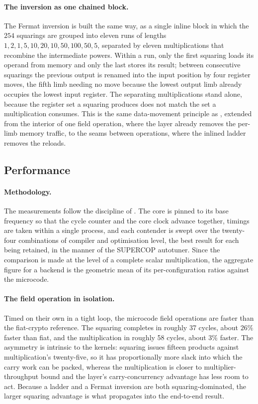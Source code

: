\paragraph{The inversion as one chained block.}
The Fermat inversion is built the same way, as a single inline block in which the
$254$ squarings are grouped into eleven runs of lengths
$1,2,1,5,10,20,10,50,100,50,5$, separated by eleven multiplications that recombine
the intermediate powers. Within a run, only the first squaring loads its operand
from memory and only the last stores its result; between consecutive squarings the
previous output is renamed into the input position by four register moves, the
fifth limb needing no move because the lowest output limb already occupies the
lowest input register. The separating multiplications stand alone, because the
register set a squaring produces does not match the set a multiplication consumes.
This is the same data-movement principle as , extended from the
interior of one field operation, where the layer already removes the per-limb
memory traffic, to the seams between operations, where the inlined ladder removes
the reloads.

\subsection{Performance}
\label{sec:c25519-perf}

\paragraph{Methodology.}
The measurements follow the discipline of . The core is pinned to
its base frequency so that the cycle counter and the core clock advance together,
timings are taken within a single process, and each contender is swept over the
twenty-four combinations of compiler and optimisation level, the best result for
each being retained, in the manner of the SUPERCOP autotuner. Since the comparison
is made at the level of a complete scalar multiplication, the aggregate figure for
a backend is the geometric mean of its per-configuration ratios against the
microcode.

\paragraph{The field operation in isolation.}
Timed on their own in a tight loop, the microcode field operations are faster than
the fiat-crypto reference. The squaring completes in roughly 37 cycles, about
$26\%$ faster than fiat, and the multiplication in roughly 58 cycles, about $3\%$
faster. The asymmetry is intrinsic to the kernels: squaring issues fifteen
products against multiplication's twenty-five, so it has proportionally more slack
into which the carry work can be packed, whereas the multiplication is closer to
multiplier-throughput bound and the layer's carry-concurrency advantage has less
room to act. Because a ladder and a Fermat inversion are both squaring-dominated,
the larger squaring advantage is what propagates into the end-to-end result.

